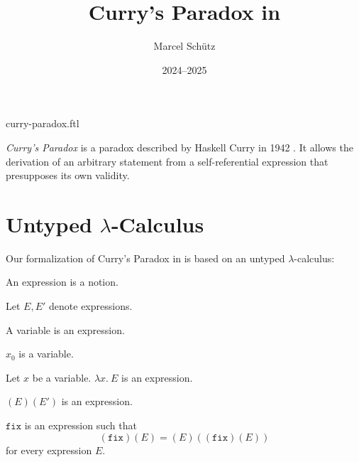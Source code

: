\documentclass{article}
\title{Curry's Paradox in \Naproche}
\author{Marcel Schütz}
\date{2024--2025}
\newcommand{\varzero}{x_0}
\newcommand{\abs}[2]{\lambda#1.\ #2}
\newcommand{\app}[2]{(#1)(#2)}
\newcommand{\fix}{\texttt{fix}}
\begin{document}
\begin{smodule}{curry-paradox.ftl}
\maketitle


\noindent \emph{Curry's Paradox} is a paradox described by Haskell Curry in 
1942 \cite{Curry1942}.
It allows the derivation of an arbitrary statement from a self-referential 
expression that presupposes its own validity.

\section*{Untyped $\lambda$-Calculus}

\noindent Our formalization of Curry's Paradox in \Naproche is based on an 
untyped $\lambda$-calculus:

\begin{forthel}
  \begin{signature*}
    An expression is a notion.
  \end{signature*}

  Let $E, E'$ denote expressions.

  \begin{signature*}
    A variable is an expression.
  \end{signature*}

  \begin{signature*}
    $\varzero$ is a variable.
  \end{signature*}

  \begin{signature*}[title=Abstraction,id=abstraction]
    Let $x$ be a variable.
    $\abs{x}{E}$ is an expression.
  \end{signature*}

  \begin{signature*}[title=Application,id=application]
    $\app{E}{E'}$ is an expression.
  \end{signature*}

  \begin{signature*}[title=Fixed-point combinator,id=fixed_point_combinator]
    $\fix$ is an expression such that
    \[\app{\fix}{E} = \app{E}{\app{\fix}{E}}\]
    for every expression $E$.
  \end{signature*}
\end{forthel}



\end{smodule}
\end{document}
